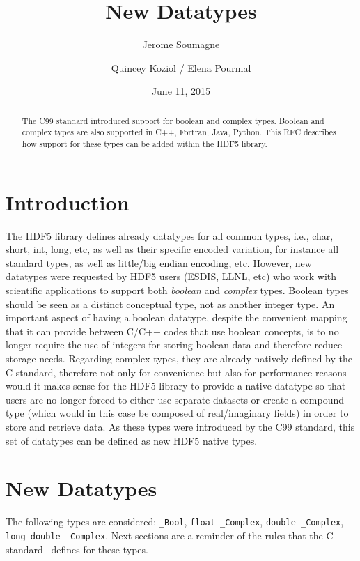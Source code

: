 \documentclass[letterpaper,hyper]{THG_RFC}
\title{New Datatypes}
\author{Jerome Soumagne}
\author{Quincey Koziol / Elena Pourmal}
\date{June 11, 2015}
\begin{document}

\maketitle

\begin{abstract}
The C99 standard introduced support for boolean and complex types.
Boolean and complex types are also supported in C++, Fortran, Java, Python.
This RFC describes how support for these types can be added within the HDF5 library.
\end{abstract}

\section{Introduction}
The HDF5 library defines already datatypes for all common types, i.e., char,
short, int, long, etc, as well as their specific encoded variation, for instance
all standard types, as well as little/big endian encoding, etc.
However, new datatypes were requested by HDF5 users (ESDIS, LLNL, etc) who
work with scientific applications to support both \textit{boolean} and
\textit{complex} types. Boolean types should be seen as a distinct conceptual
type, not as another integer type. An important
aspect of having a boolean datatype, despite the convenient mapping that it can
provide between C/C++ codes that use boolean concepts, is to no longer require
the use of integers for storing boolean data and therefore reduce storage needs. 
Regarding complex types, they are already natively defined by the C standard,
therefore not only for convenience but also for performance reasons would it
makes sense for the HDF5 library to provide a native datatype so that users
are no longer forced to either use separate datasets or create a
compound type (which would in this case be composed of real/imaginary fields)
in order to store and retrieve data. As these types were introduced by the
C99 standard, this set of datatypes can be defined as new HDF5 native types.

\section{New Datatypes}

The following types are considered: \texttt{\_Bool}, \texttt{float \_Complex},
\texttt{double \_Complex}, \texttt{long double \_Complex}.
Next sections are a reminder of the rules that the C standard~\cite{c11} defines
for these types.
\end{document}
